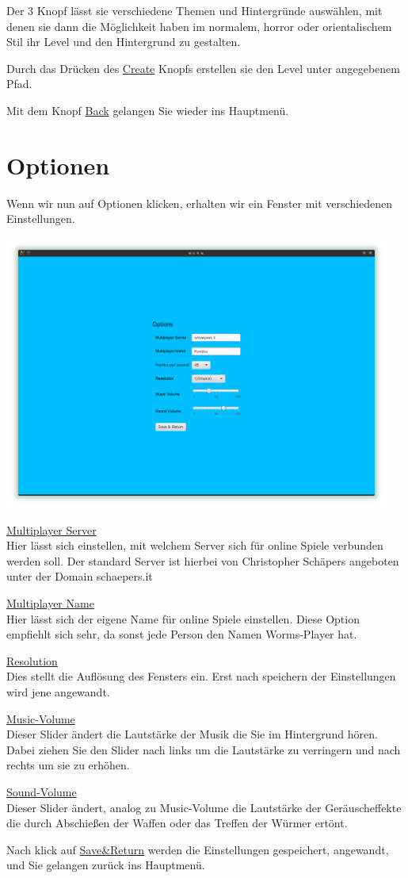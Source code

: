 \documentclass{scrreprt}
\begin{document}
Der 3 Knopf lässt sie verschiedene Themen und Hintergründe auswählen, mit denen sie dann die Möglichkeit haben im normalem, horror oder orientalischem Stil ihr Level und den Hintergrund zu gestalten.

Durch das Drücken des \underline{Create} Knopfs erstellen sie den Level unter angegebenem Pfad.

Mit dem Knopf \underline{Back} gelangen Sie wieder ins Hauptmenü.

\chapter{Optionen}
Wenn wir nun auf Optionen klicken, erhalten wir ein Fenster mit verschiedenen Einstellungen.

\includegraphics[height=9cm]{Screenshot2.png}

\underline{Multiplayer Server}\\
Hier lässt sich einstellen, mit welchem Server sich für online Spiele verbunden werden soll. Der standard Server ist hierbei von
Christopher Schäpers angeboten unter der Domain schaepers.it

\underline{Multiplayer Name}\\
Hier lässt sich der eigene Name für online Spiele einstellen. Diese Option empfiehlt sich sehr, da sonst jede Person den Namen
Worms-Player hat.

\underline{Resolution}\\
Dies stellt die Auflösung des Fensters ein. Erst nach speichern der Einstellungen wird jene angewandt.

\underline{Music-Volume}\\
Dieser Slider ändert die Lautstärke der Musik die Sie im Hintergrund hören. Dabei ziehen Sie den Slider nach links um
die Lautstärke zu verringern und nach rechts um sie zu erhöhen.

\underline{Sound-Volume}\\
Dieser Slider ändert, analog zu Music-Volume die Lautstärke der Geräuscheffekte die durch Abschießen der Waffen oder das Treffen
der Würmer ertönt.

Nach klick auf \underline{Save\&Return} werden die Einstellungen gespeichert, angewandt, und Sie gelangen zurück ins Hauptmenü.
\end{document}

